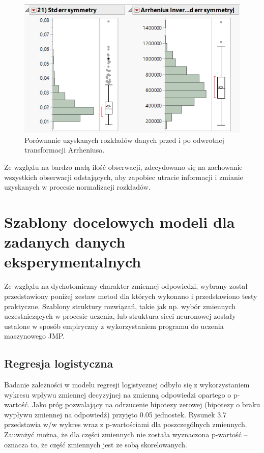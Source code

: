 	\newpage
	\begin{figure}[!ht]
		\centering
		\includegraphics[width=0.7\linewidth]{Rysunki/Rozdzial3/arrhenius}
		\caption{Porównanie uzyskanych rozkładów danych przed i po odwrotnej transformacji Arrheniusa.}
		\label{fig:arrhenius}
	\end{figure}
	
	Ze względu na bardzo małą ilość obserwacji, zdecydowano się na zachowanie wszystkich obserwacji odstających, aby zapobiec utracie informacji i zmianie uzyskanych w procesie normalizacji rozkładów.

\section{Szablony docelowych modeli dla zadanych danych eksperymentalnych}

Ze względu na dychotomiczny charakter zmiennej odpowiedzi, wybrany został przedstawiony poniżej zestaw metod dla których wykonano i przedstawiono testy praktyczne. Szablony struktury rozwiązań, takie jak np. wybór zmiennych uczestniczących w procesie uczenia, lub struktura sieci neuronowej zostały ustalone w sposób empiryczny z wykorzystaniem programu do uczenia maszynowego JMP. 

\subsection{Regresja logistyczna}

Badanie zależności w modelu regresji logistycznej odbyło się z wykorzystaniem wykresu wpływu zmiennej decyzyjnej na zmienną odpowiedzi opartego o p-wartość. Jako próg pozwalający na odrzucenie hipotezy zerowej (hipotezy o braku wypływu zmiennej na odpowiedź) przyjęto 0.05 jednostek. Rysunek 3.7 przedstawia w/w wykres wraz z p-wartościami dla poszczególnych zmiennych. Zauważyć można, że dla części zmiennych nie została wyznaczona p-wartość -- oznacza to, że część zmiennych jest ze sobą skorelowanych.

